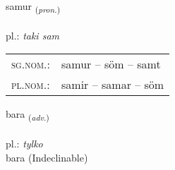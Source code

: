 \documentclass[frontgrid, backgrid]{flacards}\usepackage[]{graphicx}\usepackage[]{xcolor}
\begin{document}
\renewcommand{\flhead}{\vskip5pt \fboxsep=0pt {\small\bfseries\footnotesize Fornafn | zaimek}}
\renewcommand{\fcfoot}{\vskip5pt \fboxsep=0pt \hspace{2pt}{\small\bfseries\footnotesize 1K}}

\renewcommand{\blhead}{\vskip5pt {\small\bfseries\footnotesize Fornafn | zaimek }}
\renewcommand{\bcfoot}{\vskip5pt \hspace{2pt}{\small\bfseries\footnotesize 1K}}


{samur \small{\textsubscript{(\textit{pron.})}} \\[1ex] %
\textphonetic{[saːmʏr]} \\
pl.: \emph{taki sam} \\  [2ex]
\renewcommand*{\arraystretch}{0.8}
\begin{tabular}{ll}
\textsc{sg.nom.}: & samur  --  söm -- samt \\ 
\textsc{pl.nom.}: & samir -- samar -- söm
\end{tabular}
}


\renewcommand{\flhead}{\vskip5pt \fboxsep=0pt {\small\bfseries\footnotesize Atviksorð | przysłówek}}
\renewcommand{\fcfoot}{\vskip5pt \fboxsep=0pt \hspace{2pt}{\small\bfseries\footnotesize 1K}}

\renewcommand{\blhead}{\vskip5pt {\small\bfseries\footnotesize Atviksorð | przysłówek }}
\renewcommand{\bcfoot}{\vskip5pt \hspace{2pt}{\small\bfseries\footnotesize 1K}}


{bara \small{\textsubscript{(\textit{adv.})}} \\[1ex]
\textphonetic{[paːra]} \\
pl.: \emph{tylko} \\  [2ex]
bara (Indeclinable)}

\renewcommand{\flhead}{\vskip5pt \fboxsep=0pt {\small\bfseries\footnotesize Lýsingarorð | przymiotnik}}
\renewcommand{\fcfoot}{\vskip5pt \fboxsep=0pt \hspace{2pt}{\small\bfseries\footnotesize 1K}}
\end{document}
